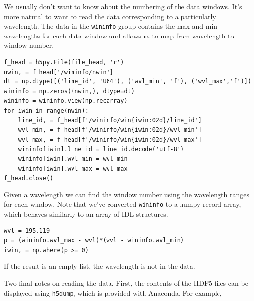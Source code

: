 We usually don't want to know about the numbering of the data windows. It's more natural to want to
read the data corresponding to a particularly wavelength. The data in the \verb+wininfo+ group
contains the max and min wavelengths for each data window and allows us to map from wavelength to
window number.
\begin{lstlisting}
f_head = h5py.File(file_head, 'r')
nwin, = f_head['/wininfo/nwin']
dt = np.dtype([('line_id', 'U64'), ('wvl_min', 'f'), ('wvl_max','f')])
wininfo = np.zeros((nwin,), dtype=dt)
wininfo = wininfo.view(np.recarray)
for iwin in range(nwin):
    line_id, = f_head[f'/wininfo/win{iwin:02d}/line_id']
    wvl_min, = f_head[f'/wininfo/win{iwin:02d}/wvl_min']
    wvl_max, = f_head[f'/wininfo/win{iwin:02d}/wvl_max']
    wininfo[iwin].line_id = line_id.decode('utf-8')
    wininfo[iwin].wvl_min = wvl_min
    wininfo[iwin].wvl_max = wvl_max
f_head.close()
\end{lstlisting}
Given a wavelength we can find the window number using the wavelength ranges for each window. Note
that we've converted \verb+wininfo+ to a numpy record array, which behaves similarly to an array of
IDL structures.
\begin{lstlisting}
wvl = 195.119
p = (wininfo.wvl_max - wvl)*(wvl - wininfo.wvl_min)
iwin, = np.where(p >= 0)
\end{lstlisting}
If the result is an empty list, the wavelength is not in the data.

Two final notes on reading the data. First, the contents of the HDF5 files can be displayed using
\verb+h5dump+, which is provided with Anaconda. For example,

